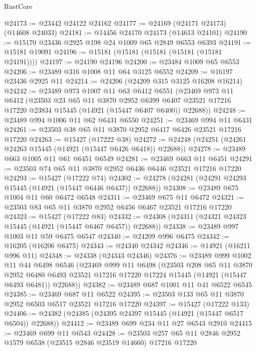 \begin{lexlean}{RustCore}
\begin{coremodule}
@24173 := @23442 @24122 @24162
@24177 := @24169 (@24171 @24173) (@14608 @24033)
@24181 := @14456 @24170 @24173 (@14613 @24101)
@24190 := @15170 @23436 @2925 @198 @24 @1009 @65 @2849 @6553 @6393
@24191 := @15181 @19091
@24196 := @15181 (@15181 (@15181 (@15181 (@15181 @24191))))
@24197 := @24190 @24196
@24200 := @23484 @1009 @65 @6553
@24206 := @23489 @316 @1008 @11 @64 @3125 @6552
@24209 := @16197 @23436 @2925 @11
@24214 := @24206 (@24209 @315 @3125 @16208 @16214)
@24242 := @23489
    @973
    @1007
    @11
    @63
    @6412
    @6551
    (@23469
      @973
      @11
      @6412
      (@23503
        @23
        @65
        @11
        @3870
        @2952
        @6399
        @6407
        @23521
        @17216
        @17220
        @23834
        @15445
        (@14921 (@15447 @6407 @6400))
        @22688))
@24248 := @23489 @994 @1006 @11 @62 @6431 @6550
@24251 := @23469 @994 @11 @6431
@24261 := @23503 @38 @65 @11 @3870 @2952 @6417 @6426 @23521 @17216 @17220
@24263 := @15427 (@17222 @38)
@24272 := @24248 (@24251 (@24261 @24263 @15445 (@14921 (@15447 @6426 @6418)) @22688))
@24278 := @23489 @663 @1005 @11 @61 @6451 @6549
@24281 := @23469 @663 @11 @6451
@24291 := @23503 @74 @65 @11 @3870 @2952 @6436 @6446 @23521 @17216 @17220
@24293 := @15427 (@17222 @74)
@24302 := @24278 (@24281 (@24291 @24293 @15445 (@14921 (@15447 @6446 @6437)) @22688))
@24308 := @23489 @675 @1004 @11 @60 @6472 @6548
@24311 := @23469 @675 @11 @6472
@24321 := @23503 @83 @65 @11 @3870 @2952 @6456 @6467 @23521 @17216 @17220
@24323 := @15427 (@17222 @83)
@24332 := @24308 (@24311 (@24321 @24323 @15445 (@14921 (@15447 @6467 @6457)) @22688))
@24338 := @23489 @997 @1003 @11 @59 @6475 @6547
@24340 := @24209 @996 @6475
@24342 := @16205 (@16206 @6475)
@24343 := @24340 @24342
@24346 := @14921 (@16211 @996 @11)
@24348 := @24338 (@24343 @24346)
@24376 := @23489
    @999
    @1002
    @11
    @44
    @6498
    @6546
    (@23469
      @999
      @11
      @6498
      (@23503
        @208
        @65
        @11
        @3870
        @2952
        @6480
        @6493
        @23521
        @17216
        @17220
        @17224
        @15445
        (@14921 (@15447 @6493 @6481))
        @22688))
@24382 := @23489 @687 @1001 @11 @41 @6522 @6545
@24385 := @23469 @687 @11 @6522
@24395 := @23503 @133 @65 @11 @3870 @2952 @6503 @6517 @23521 @17216 @17220
@24397 := @15427 (@17222 @133)
@24406 := @24382 (@24385 (@24395 @24397 @15445 (@14921 (@15447 @6517 @6504)) @22688))
@24412 := @23489 @699 @234 @11 @27 @6543 @2910
@24415 := @23469 @699 @11 @6543
@24428 := @23503 @257 @65 @11 @2846 @2952 @1579 @6538 (@23515 @2846 @23519 @14660) @17216 @17220

\end{coremodule}
\end{lexlean}
